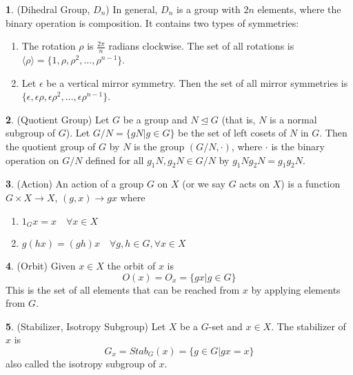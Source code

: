 \documentclass[12pt]{article}
\theoremstyle{definition}
\newtheorem{definition}{\color{NavyBlue}{\textbf{Definition}}}
\newcommand{\e}{\epsilon}
\begin{document}
\begin{definition}(Dihedral Group, $D_n$)
In general, $D_n$ is a group with $2n$ elements, where the binary operation is composition. It contains two types of symmetries:
\begin{enumerate}
\item The rotation $\rho$ is $\frac{2\pi}{n}$ radians clockwise. The set of all rotations is $\langle \rho \rangle = \{1, \rho, \rho^2, \ldots, \rho^{n-1} \}$.
\item Let $\e$ be a vertical mirror symmetry. Then the set of all mirror symmetries is $\{\e, \e\rho, \e\rho^2, \ldots, \e \rho^{n-1} \}$.
\end{enumerate}
\end{definition}

\begin{definition}(Quotient Group)
Let $G$ be a group and $N \trianglelefteq G$ (that is, $N$ is a normal subgroup of $G$). Let $G/N = \{gN|g \in G\}$ be the set of left cosets of $N$ in $G$. Then the quotient group of $G$ by $N$ is the group $(G/N, \cdot)$, where $\cdot$ is the binary operation on $G/N$ defined for all $g_1 N, g_2 N \in G / N$ by $g_1 N g_2 N = g_1g_2N$.
\end{definition}

\begin{definition}(Action)
An action of a group $G$ on $X$ (or we say $G$ acts on $X$) is a function $G \times X \to X$, $(g,x) \to gx$ where
\begin{enumerate}
\item $1_G x = x \quad \forall x \in X$
\item $g(hx) = (gh)x \quad \forall g,h \in G, \forall x \in X$
\end{enumerate}
\end{definition}

\begin{definition}(Orbit)
Given $x \in X$ the orbit of $x$ is
\begin{equation}
O(x) = O_x = \{gx | g \in G\}
\end{equation}
This is the set of all elements that can be reached from $x$ by applying elements from $G$.
\end{definition}

\begin{definition}(Stabilizer, Isotropy Subgroup)
Let $X$ be a $G$-set and $x \in X$. The stabilizer of $x$ is
\begin{equation}
G_x = Stab_G(x) = \{ g\in G | gx = x \}
\end{equation}
also called the isotropy subgroup of $x$.
\end{definition}
\end{document}
